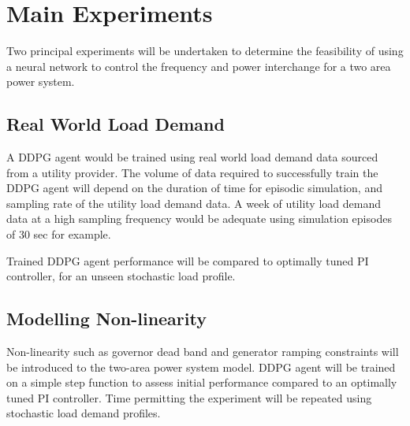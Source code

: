 \section{Main Experiments}
Two principal experiments will be undertaken to determine the feasibility of using a neural network to control the frequency and power interchange for a two area power system.


\subsection{Real World Load Demand}
A DDPG agent would be trained using real world load demand data sourced from a utility provider. The volume of data required to successfully train the DDPG agent will depend on the duration of time for episodic simulation, and sampling rate of the utility load demand data. A week of utility load demand data at a high sampling frequency would be adequate using simulation episodes of 30 sec for example.

Trained DDPG agent performance will be compared to optimally tuned PI controller, for an unseen stochastic load profile.



\subsection{Modelling Non-linearity}
Non-linearity such as governor dead band and generator ramping constraints will be introduced to the two-area power system model. DDPG agent will be trained on a simple step function to assess initial performance compared to an optimally tuned PI controller. Time permitting the experiment will be repeated using stochastic load demand profiles.